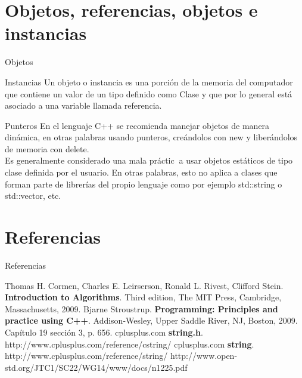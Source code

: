 \documentclass[aspectratio=169]{beamer}
\begin{document}
\section{Objetos, referencias, objetos e instancias}
\begin{frame}{Objetos}
\begin{block}{Instancias}
Un objeto o instancia es una porción de la memoria del computador que contiene un valor de un tipo definido como Clase y que por lo general está asociado a una variable llamada referencia.
\end{block}
\begin{block}{Punteros}
En el lenguaje C++ se recomienda manejar objetos de manera dinámica, en otras palabras usando punteros, creándolos con \alert{new} y liberándolos de memoria con \alert{delete}. \\
Es generalmente considerado una mala práctica usar objetos estáticos de tipo clase definida por el usuario. En otras palabras, esto no aplica a clases que forman parte de librerías del propio lenguaje como por ejemplo std::string o std::vector, etc.
\end{block}
\end{frame}
\section{Referencias}
\begin{frame}{Referencias}
\begin{thebibliography}{9}
Thomas H. Cormen, Charles E. Leirserson, Ronald L. Rivest, Clifford Stein.
\textbf{Introduction to Algorithms}.
Third edition, The MIT Press, Cambridge, Massachusetts, 2009.
Bjarne Stroustrup.
\textbf{Programming: Principles and practice using C++}.
Addison-Wesley, Upper Saddle River, NJ, Boston, 2009. Capítulo 19 sección 3, p. 656.
cplusplus.com
\textbf{string.h}. http://www.cplusplus.com/reference/cstring/
cplusplus.com
\textbf{string}. http://www.cplusplus.com/reference/string/
http://www.open-std.org/JTC1/SC22/WG14/www/docs/n1225.pdf
\end{thebibliography}
\end{frame}
\end{document}
